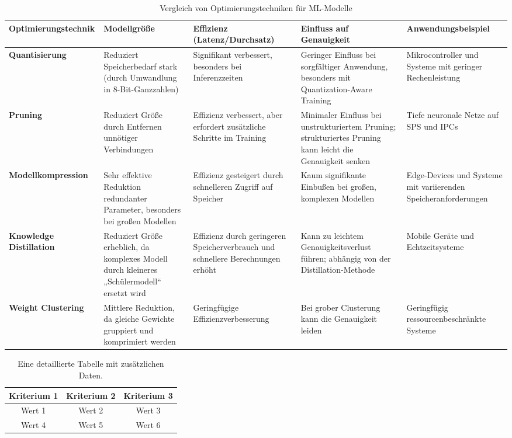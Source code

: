 \begin{sidewaystable}[h!]
    \centering
    \caption{Vergleich von Optimierungstechniken für ML-Modelle}
    \begin{tabular}{|l|p{4cm}|p{4cm}|p{4cm}|p{4cm}|}
    \hline
    \textbf{Optimierungstechnik} & \textbf{Modellgröße} & \textbf{Effizienz (Latenz/Durchsatz)} & \textbf{Einfluss auf Genauigkeit} & \textbf{Anwendungsbeispiel} \\ \hline
    \textbf{Quantisierung} & Reduziert Speicherbedarf stark (durch Umwandlung in 8-Bit-Ganzzahlen) & Signifikant verbessert, besonders bei Inferenzzeiten & Geringer Einfluss bei sorgfältiger Anwendung, besonders mit Quantization-Aware Training & Mikrocontroller und Systeme mit geringer Rechenleistung \\ \hline
    \textbf{Pruning} & Reduziert Größe durch Entfernen unnötiger Verbindungen & Effizienz verbessert, aber erfordert zusätzliche Schritte im Training & Minimaler Einfluss bei unstrukturiertem Pruning; strukturiertes Pruning kann leicht die Genauigkeit senken & Tiefe neuronale Netze auf SPS und IPCs \\ \hline
    \textbf{Modellkompression} & Sehr effektive Reduktion redundanter Parameter, besonders bei großen Modellen & Effizienz gesteigert durch schnelleren Zugriff auf Speicher & Kaum signifikante Einbußen bei großen, komplexen Modellen & Edge-Devices und Systeme mit variierenden Speicheranforderungen \\ \hline
    \textbf{Knowledge Distillation} & Reduziert Größe erheblich, da komplexes Modell durch kleineres „Schülermodell“ ersetzt wird & Effizienz durch geringeren Speicherverbrauch und schnellere Berechnungen erhöht & Kann zu leichtem Genauigkeitsverlust führen; abhängig von der Distillation-Methode & Mobile Geräte und Echtzeitsysteme \\ \hline
    \textbf{Weight Clustering} & Mittlere Reduktion, da gleiche Gewichte gruppiert und komprimiert werden & Geringfügige Effizienzverbesserung & Bei grober Clusterung kann die Genauigkeit leiden & Geringfügig ressourcenbeschränkte Systeme \\ \hline
    \end{tabular}
    \label{tab:appendix_table}
\end{sidewaystable}

\begin{table}[h!]
    \centering
    \begin{tabular}{|c|c|c|}
    \hline
    Kriterium 1 & Kriterium 2 & Kriterium 3 \\ \hline
    Wert 1     & Wert 2     & Wert 3     \\ \hline
    Wert 4     & Wert 5     & Wert 6     \\ \hline
    \end{tabular}
    \caption{Eine detaillierte Tabelle mit zusätzlichen Daten.}
    
    \end{table}
    